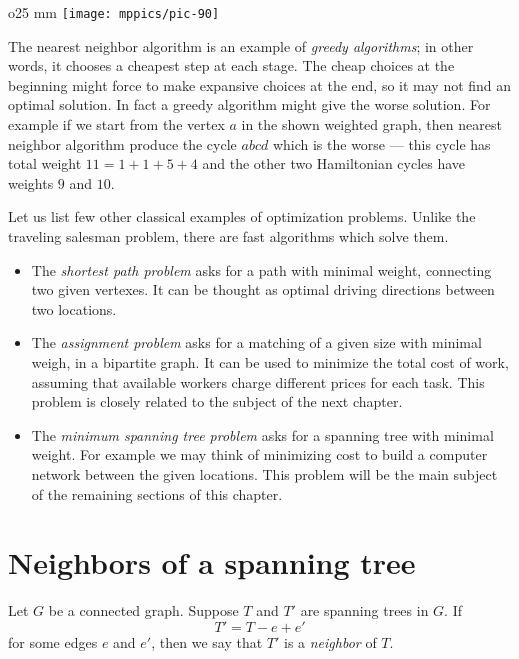 \begin{wrapfigure}{o}{25 mm}
\vskip-0mm
\centering
\texttt{[image: mppics/pic-90]}
\end{wrapfigure}

The nearest neighbor algorithm is an example of \emph{greedy algorithms}; in other words, it chooses a cheapest step at each stage.
The cheap choices at the beginning might force to make expansive choices at the end,
so it may not find an optimal solution. 
In fact a greedy algorithm might give the worse solution.
For example if we start from the vertex $a$ in the shown weighted graph, then nearest neighbor algorithm produce the cycle $abcd$ which is the worse --- this cycle has total weight $11=1+1+5+4$ and the other two  Hamiltonian cycles have weights $9$ and $10$.

Let us list few other classical examples of optimization problems.
Unlike the traveling salesman problem, there are fast algorithms which solve them.
\begin{itemize}
\item The \emph{shortest path problem} asks for a path with minimal weight, connecting two given vertexes.
It can be thought as optimal driving directions between two locations.
\item The \label{assignment problem}\emph{assignment problem}  asks for a matching of a given size with minimal weigh, in a bipartite graph.
It can be used to minimize the total cost of work, assuming that available workers charge different prices for each task.
This problem is closely related to the subject of the next chapter.
\item The \emph{minimum spanning tree problem} asks for a spanning tree with minimal weight.
For example we may think of minimizing cost to build a computer network between the given locations.
This problem will be the main subject of the remaining sections of this chapter.
\end{itemize}


\section*{Neighbors of a spanning tree}

Let $G$ be a connected graph.
Suppose $T$ and $T'$ are spanning trees in $G$.
If 
\[T'=T-e+e'\]
for some edges $e$ and $e'$,
then we say that $T'$ is a \emph{neighbor} of $T$.

